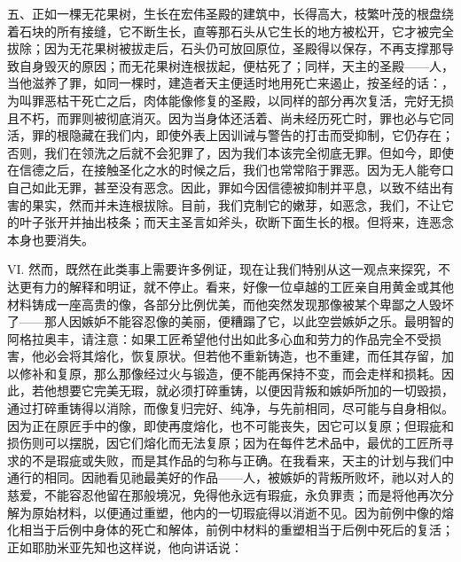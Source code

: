 五、正如一棵无花果树，生长在宏伟圣殿的建筑中，长得高大，枝繁叶茂的根盘绕着石块的所有接缝，它不断生长，直等那石头从它生长的地方被松开，它才被完全拔除；因为无花果树被拔走后，石头仍可放回原位，圣殿得以保存，不再支撑那导致自身毁灭的原因；而无花果树连根拔起，便枯死了；同样，天主的圣殿——人，当他滋养了罪，如同一棵时，建造者天主便适时地用死亡来遏止，按圣经的话：，为叫罪恶枯干死亡之后，肉体能像修复的圣殿，以同样的部分再次复活，完好无损且不朽，而罪则被彻底消灭。因为当身体还活着、尚未经历死亡时，罪也必与它同活，罪的根隐藏在我们内，即使外表上因训诫与警告的打击而受抑制，它仍存在；否则，我们在领洗之后就不会犯罪了，因为我们本该完全彻底无罪。但如今，即使在信德之后，在接触圣化之水的时候之后，我们也常常陷于罪恶。因为无人能夸口自己如此无罪，甚至没有恶念。因此，罪如今因信德被抑制并平息，以致不结出有害的果实，然而并未连根拔除。目前，我们克制它的嫩芽，如恶念，我们，不让它的叶子张开并抽出枝条；而天主圣言如斧头，砍断下面生长的根。但将来，连恶念本身也要消失。\par

VI. 然而，既然在此类事上需要许多例证，现在让我们特别从这一观点来探究，不达更有力的解释和明证，就不停止。看来，好像一位卓越的工匠亲自用黄金或其他材料铸成一座高贵的像，各部分比例优美，而他突然发现那像被某个卑鄙之人毁坏了——那人因嫉妒不能容忍像的美丽，便糟蹋了它，以此空尝嫉妒之乐。最明智的阿格拉奥丰，请注意：如果工匠希望他付出如此多心血和劳力的作品完全不受损害，他必会将其熔化，恢复原状。但若他不重新铸造，也不重建，而任其存留，加以修补和复原，那么那像经过火与锻造，便不能再保持不变，而会走样和损耗。因此，若他想要它完美无瑕，就必须打碎重铸，以便因背叛和嫉妒所加的一切毁损，通过打碎重铸得以消除，而像复归完好、纯净，与先前相同，尽可能与自身相似。因为正在原匠手中的像，即使再度熔化，也不可能丧失，因它可以复原；但瑕疵和损伤则可以摆脱，因它们熔化而无法复原；因为在每件艺术品中，最优的工匠所寻求的不是瑕疵或失败，而是其作品的匀称与正确。在我看来，天主的计划与我们中通行的相同。因祂看见祂最美好的作品——人，被嫉妒的背叛所败坏，祂以对人的慈爱，不能容忍他留在那般境况，免得他永远有瑕疵，永负罪责；而是将他再次分解为原始材料，以便通过重塑，他内的一切瑕疵得以消逝不见。因为前例中像的熔化相当于后例中身体的死亡和解体，前例中材料的重塑相当于后例中死后的复活；正如耶肋米亚先知也这样说，他向讲话说：\par

